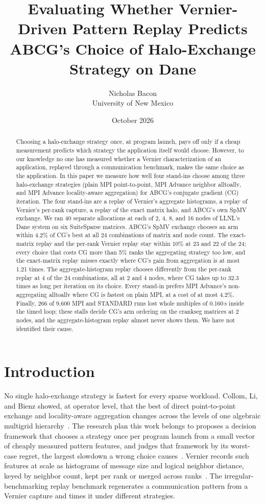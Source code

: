\documentclass[11pt]{article}
\title{Evaluating Whether Vernier-Driven Pattern Replay Predicts\\ABCG's Choice of Halo-Exchange Strategy on Dane}
\author{Nicholas Bacon\\University of New Mexico}
\date{October 2026}
\begin{document}
\maketitle

\begin{abstract}
Choosing a halo-exchange strategy once, at program launch, pays off only if a cheap
measurement predicts which strategy the application itself would choose. However, to
our knowledge no one has measured whether a Vernier characterization of an
application, replayed through a communication benchmark, makes the same choice as the
application. In this paper we measure how well four stand-ins choose among three
halo-exchange strategies (plain MPI point-to-point, MPI Advance neighbor alltoallv, and
MPI Advance locality-aware aggregation) for ABCG's conjugate gradient (CG) iteration.
The four stand-ins are a replay of Vernier's aggregate histograms, a replay of Vernier's
per-rank capture, a replay of the exact matrix halo, and ABCG's own SpMV exchange. We
ran 40 separate allocations at each of 2, 4, 8, and 16 nodes of LLNL's Dane system on
six SuiteSparse matrices. ABCG's SpMV exchange chooses an arm within 4.2\% of CG's best
at all 24 combinations of matrix and node count. The exact-matrix replay and the per-rank
Vernier replay stay within 10\% at 23 and 22 of the 24; every choice that costs CG more
than 5\% ranks the aggregating strategy too low, and the exact-matrix replay misses
exactly where CG's gain from aggregation is at most 1.21 times. The aggregate-histogram
replay chooses differently from the per-rank replay at 4 of the 24 combinations, all at
2 and 4 nodes, where CG takes up to 32.3 times as long per iteration on its choice.
Every stand-in prefers MPI Advance's non-aggregating alltoallv where CG is fastest on
plain MPI, at a cost of at most 4.2\%. Finally, 266 of 9,600 MPI and STANDARD runs lost
whole multiples of 0.160\,s inside the timed loop; these stalls decide CG's arm ordering
on the crankseg matrices at 2 nodes, and the aggregate-histogram replay almost never
shows them. We have not identified their cause.
\end{abstract}

\section{Introduction}

No single halo-exchange strategy is fastest for every sparse workload. Collom, Li, and
Bienz showed, at operator level, that the best of direct point-to-point exchange and
locality-aware aggregation changes across the levels of one algebraic multigrid
hierarchy~\cite{collom2023}. The research plan this work belongs to proposes a decision
framework that chooses a strategy once per program launch from a small vector of
cheaply measured pattern features, and judges that framework by its worst-case regret,
the largest slowdown a wrong choice causes~\cite{researchplan}. Vernier records such
features at scale as histograms of message size and logical neighbor distance, keyed by
neighbor count, kept per rank or merged across ranks~\cite{vernier2025}. The
irregular-benchmarking replay benchmark regenerates a communication pattern from a
Vernier capture and times it under different strategies.
\end{document}
